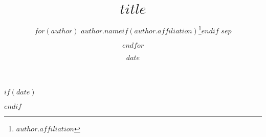 %

\title{$title$}
\author{%
    $for(author)$
    $author.name$$if(author.affiliation)$\thanks{$author.affiliation$}$endif$
    $sep$ \and
    $endfor$
}

$if(date)$
\date{$date$}
$endif$

\newcommand{\makeabstract}{
\begin{abstract}
$if(abstract)$
    $abstract$
$else$
    Please write an abstract in the \texttt{paper-meta.yaml} file.
$endif$
\end{abstract}
}
